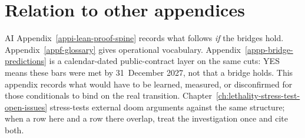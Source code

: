 \section{Relation to other appendices}
\begin{authbar}{AI}
Appendix~\ref{appi-lean-proof-spine} records what follows \emph{if} the bridges hold.
Appendix~\ref{appf-glossary} gives operational vocabulary.
Appendix~\ref{appp-bridge-predictions} is a calendar-dated public-contract layer on the same cuts: YES means these bars were met by 31~December 2027, not that a bridge holds.
This appendix records what would have to be learned, measured, or disconfirmed for those conditionals to bind on the real transition.
Chapter~\ref{ch:lethality-stress-test-open-issues} stress-tests external doom arguments against the same structure; when a row here and a row there overlap, treat the investigation once and cite both.
\end{authbar}
